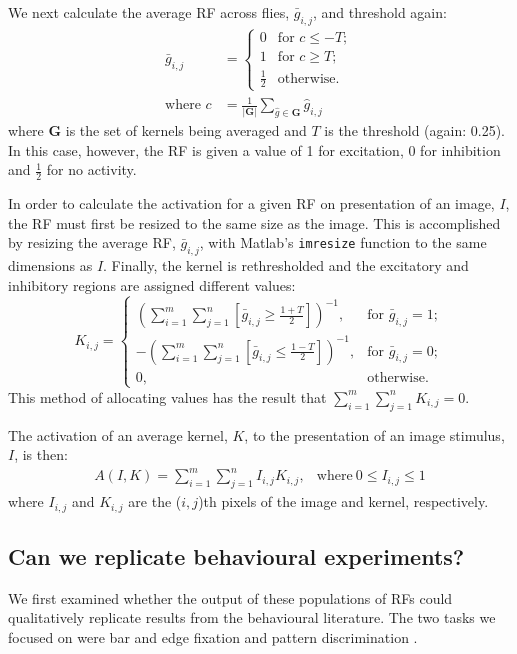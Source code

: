 We next calculate the average \ac{RF} across flies, $\bar{g}_{i,j}$, and threshold again:
\begin{align*}
\bar{g}_{i,j} &= \left\{ \begin{array}{rl}
			0 & \mbox{for } c \le -T; \\
			1 & \mbox{for } c \ge T; \\
			\frac{1}{2} & \mbox{otherwise.} 
			\end{array} \right. \\
\mbox{where } c &= \frac{1}{|\mathbf{G}|}\sum\limits_{\hat{g} \in \mathbf{G}} \hat{g}_{i,j}
\end{align*}
where $\mathbf{G}$ is the set of kernels being averaged and $T$ is the threshold (again: 0.25).
In this case, however, the \ac{RF} is given a value of 1 for excitation, 0 for inhibition and $\frac{1}{2}$ for no activity.

In order to calculate the activation for a given \ac{RF} on presentation of an image, $I$, the \ac{RF} must first be resized to the same size as the image.
This is accomplished by resizing the average \ac{RF}, $\bar{g}_{i,j}$, with Matlab's \texttt{imresize} function to the same dimensions as $I$.
Finally, the kernel is rethresholded and the excitatory and inhibitory regions are assigned different values:
$$
K_{i,j} = \left\{
\begin{array}{rl}
\left( \sum\limits^m_{i=1}\sum\limits^n_{j=1}[\bar{g}_{i,j} \ge \frac{1+T}{2}] \right)^{-1}, & \mbox{for } \bar{g}_{i,j} = 1; \\
-\left( \sum\limits^m_{i=1}\sum\limits^n_{j=1}[\bar{g}_{i,j} \le \frac{1-T}{2}] \right)^{-1}, & \mbox{for } \bar{g}_{i,j} = 0; \\
0, & \mbox{otherwise.}
\end{array}
\right.
$$
This method of allocating values has the result that $\sum\limits_{i=1}^m \sum\limits_{j=1}^n K_{i,j}=0$.

The activation of an average kernel, $K$, to the presentation of an image stimulus, $I$, is then:
$$
\begin{array}{rl}
A(I,K) = {\sum\limits^m_{i=1} \sum\limits^n_{j=1} I_{i,j}K_{i,j}}, &\mathrm{where\ } 0 \le I_{i,j} \le 1
\end{array}
$$
where $I_{i,j}$ and $K_{i,j}$ are the ($i,j$)th pixels of the image and kernel, respectively.

\subsection*{Can we replicate behavioural experiments?}
\label{sec:methods:recap}
We first examined whether the output of these populations of \acp{RF} could qualitatively replicate results from the behavioural literature.
The two tasks we focused on were bar and edge fixation \cite{Neuser2008,Osorio1990} and pattern discrimination \cite{Liu2006,Ernst1999}.

